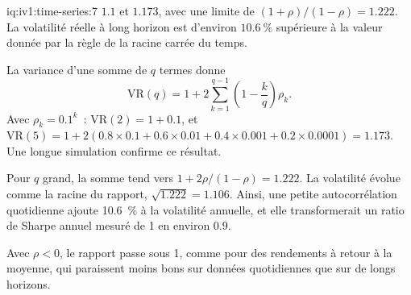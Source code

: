 \begin{solution}{iq:iv1:time-series:7}
$1.1$ et $1.173$, avec une limite de $(1 + \rho)/(1 - \rho) = 1.222$. La volatilité réelle à long horizon est d'environ $10.6~\%$ supérieure à la valeur donnée par la règle de la racine carrée du temps.

La variance d'une somme de $q$ termes donne
\[
\mathrm{VR}(q) = 1 + 2\sum_{k = 1}^{q - 1}\left(1 - \frac{k}{q}\right)\rho_k.
\]
Avec $\rho_k = 0.1^k$~: $\mathrm{VR}(2) = 1 + 0.1$, et $\mathrm{VR}(5) = 1 + 2(0.8 \times 0.1 + 0.6 \times 0.01 + 0.4 \times 0.001 + 0.2 \times 0.0001) = 1.173$. Une longue simulation confirme ce résultat.

Pour $q$ grand, la somme tend vers $1 + 2\rho/(1 - \rho) = 1.222$. La volatilité évolue comme la racine du rapport, $\sqrt{1.222} = 1.106$. Ainsi, une petite autocorrélation quotidienne ajoute 10.6~\% à la volatilité annuelle, et elle transformerait un ratio de Sharpe annuel mesuré de 1 en environ $0.9$.

Avec $\rho < 0$, le rapport passe sous 1, comme pour des rendements à retour à la moyenne, qui paraissent moins bons sur données quotidiennes que sur de longs horizons.



\end{solution}

